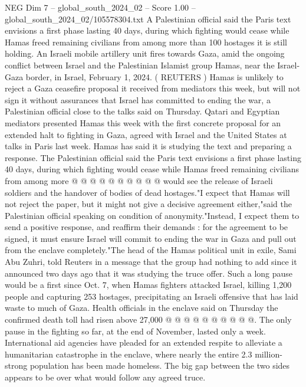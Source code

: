 \begin{textsample}{NEG Dim 7 – global\_south\_2024\_02 – Score 1.00 – global\_south\_2024\_02/105578304.txt}  \label{ex:f7_neg_253}
A Palestinian official said the Paris text envisions a first phase lasting 40 days, during which fighting would cease while Hamas freed remaining civilians from among more than 100 hostages it is still holding.
An Israeli mobile artillery unit fires towards Gaza, amid the ongoing conflict between Israel and the Palestinian Islamist group Hamas, near the Israel-Gaza border, in Israel, February 1, 2024. ( REUTERS ) Hamas is unlikely to reject a Gaza ceasefire proposal it received from mediators this week, but will not sign it without assurances that Israel has committed to ending the war, a Palestinian official close to the talks said on Thursday.
Qatari and Egyptian mediators presented Hamas this week with the first concrete proposal for an extended halt to fighting in Gaza, agreed with Israel and the United States at talks in Paris last week.
Hamas has said it is studying the text and preparing a response.
The Palestinian official said the Paris text envisions a first phase lasting 40 days, during which fighting would cease while Hamas freed remaining civilians from among more @ @ @ @ @ @ @ @ @ @ would see the release of Israeli soldiers and the handover of bodies of dead hostages."I expect that Hamas will not reject the paper, but it might not give a decisive agreement either,"said the Palestinian official speaking on condition of anonymity."Instead, I expect them to send a positive response, and reaffirm their demands : for the agreement to be signed, it must ensure Israel will commit to ending the war in Gaza and pull out from the enclave completely."The head of the Hamas political unit in exile, Sami Abu Zuhri, told Reuters in a message that the group had nothing to add since it announced two days ago that it was studying the truce offer.
Such a long pause would be a first since Oct. 7, when Hamas fighters attacked Israel, killing 1,200 people and capturing 253 hostages, precipitating an Israeli offensive that has laid waste to much of Gaza.
Health officials in the enclave said on Thursday the confirmed death toll had risen above 27,000 @ @ @ @ @ @ @ @ @ @.
The only pause in the fighting so far, at the end of November, lasted only a week.
International aid agencies have pleaded for an extended respite to alleviate a humanitarian catastrophe in the enclave, where nearly the entire 2.3 million-strong population has been made homeless.
The big gap between the two sides appears to be over what would follow any agreed truce.

\end{textsample}
